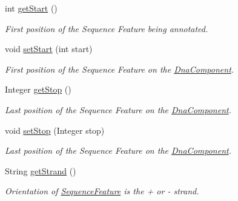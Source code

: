 \begin{DoxyCompactItemize}
int \hyperlink{classorg_1_1sbolstandard_1_1lib_s_b_o_lj_1_1_sequence_annotation_a1408176a248f41dbe8735bd3009e0cf5}{getStart} ()
\begin{DoxyCompactList}\small\item\em First position of the Sequence Feature being annotated. \item\end{DoxyCompactList}\item 
void \hyperlink{classorg_1_1sbolstandard_1_1lib_s_b_o_lj_1_1_sequence_annotation_a95797ac4da76f48db6f9da6d5c1921cb}{setStart} (int start)
\begin{DoxyCompactList}\small\item\em First position of the Sequence Feature on the \hyperlink{classorg_1_1sbolstandard_1_1lib_s_b_o_lj_1_1_dna_component}{DnaComponent}. \item\end{DoxyCompactList}\item 
Integer \hyperlink{classorg_1_1sbolstandard_1_1lib_s_b_o_lj_1_1_sequence_annotation_ab7312487c80acd0453c38faaef61de8b}{getStop} ()
\begin{DoxyCompactList}\small\item\em Last position of the Sequence Feature on the \hyperlink{classorg_1_1sbolstandard_1_1lib_s_b_o_lj_1_1_dna_component}{DnaComponent}. \item\end{DoxyCompactList}\item 
void \hyperlink{classorg_1_1sbolstandard_1_1lib_s_b_o_lj_1_1_sequence_annotation_a6f27d883517282bf39452ee31373d266}{setStop} (Integer stop)
\begin{DoxyCompactList}\small\item\em Last position of the Sequence Feature on the \hyperlink{classorg_1_1sbolstandard_1_1lib_s_b_o_lj_1_1_dna_component}{DnaComponent}. \item\end{DoxyCompactList}\item 
String \hyperlink{classorg_1_1sbolstandard_1_1lib_s_b_o_lj_1_1_sequence_annotation_aab2543119d16ab85073c45c182a7d010}{getStrand} ()
\begin{DoxyCompactList}\small\item\em Orientation of \hyperlink{classorg_1_1sbolstandard_1_1lib_s_b_o_lj_1_1_sequence_feature}{SequenceFeature} is the + or -\/ strand. \item\end{DoxyCompactList}\item 

\end{DoxyCompactItemize}
